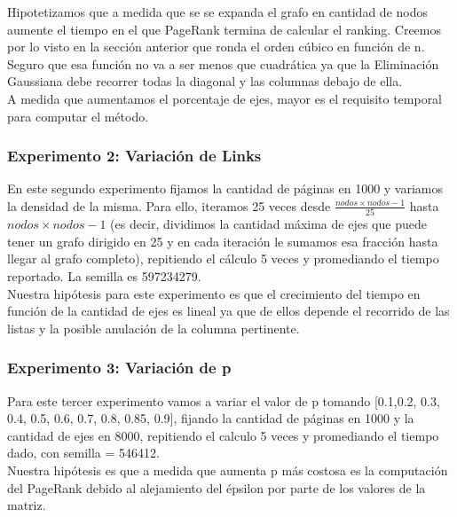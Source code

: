 Hipotetizamos que a medida que se se expanda el grafo en cantidad de nodos aumente el tiempo en el que PageRank termina de calcular el ranking. Creemos por lo visto en la sección anterior que ronda el orden cúbico en función de n. Seguro que esa función no va a ser menos que cuadrática ya que la Eliminación Gaussiana debe recorrer todas la diagonal y las columnas debajo de ella. \\

A medida que aumentamos el porcentaje de ejes, mayor es el requisito temporal para computar el método. \\ 

\subsubsection{Experimento 2: Variación de Links}
En este segundo experimento fijamos la cantidad de páginas en 1000 y variamos la densidad de la misma. Para ello, iteramos 25 veces desde $\frac{nodos \times nodos-1}{25}$ hasta $nodos \times nodos-1$ (es decir, dividimos la cantidad máxima de ejes que puede tener un grafo dirigido en 25 y en cada iteración le sumamos esa fracción hasta llegar al grafo completo), repitiendo el cálculo 5 veces y promediando el tiempo reportado. La semilla es 597234279. \\

Nuestra hipótesis para este experimento es que el crecimiento del tiempo en función de la cantidad de ejes es lineal ya que de ellos depende el recorrido de las listas y la posible anulación de la columna pertinente. \\

\subsubsection{Experimento 3: Variación de p}
Para este tercer experimento vamos a variar el valor de p tomando [0.1,0.2, 0.3, 0.4, 0.5, 0.6, 0.7, 0.8, 0.85, 0.9], fijando la cantidad de páginas en 1000 y la cantidad de ejes en 8000, repitiendo el calculo 5 veces y promediando el tiempo dado, con semilla = 546412. \\



Nuestra hipótesis es que a medida que aumenta p más costosa es la computación del PageRank debido al alejamiento del épsilon por parte de los valores de la matriz. \\

